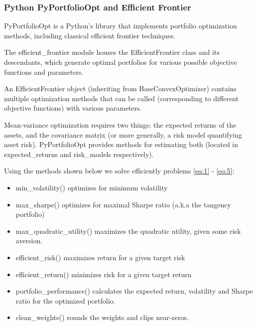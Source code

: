 \documentclass{beamer}
\begin{document}
\begin{frame}
\frametitle{\textbf{Python PyPortfolioOpt and Efficient Frontier}}

\justifying
PyPortfolioOpt is a Python's library that implements portfolio optimization methods, including classical efficient frontier techniques.

\vspace{0.2cm}
\justifying
The efficient\_frontier module houses the EfficientFrontier class and its descendants, which generate optimal portfolios for various possible objective functions and parameters.

\vspace{0.2cm}
\justifying
An EfficientFrontier object (inheriting from BaseConvexOptimizer) contains multiple optimization methods that can be called (corresponding to different objective functions) with various parameters.

\vspace{0.2cm}
\justifying
Mean-variance optimization requires two things: the expected returns of the assets, and the covariance matrix (or more generally, a risk model quantifying asset risk). PyPortfolioOpt provides methods for estimating both (located in expected\_returns and risk\_models respectively).

\end{frame}


\begin{frame}

\justifying
Using the methods shown below we solve efficiently problems \eqref{eq:1} - \eqref{eq:5}:

\vspace{0.4cm}
\justifying
\begin{itemize}
	\item min\_volatility() optimizes for minimum volatility
	\item max\_sharpe() optimizes for maximal Sharpe ratio (a.k.a the tangency portfolio)
	\item max\_quadratic\_utility() maximizes the quadratic utility, given some risk aversion.
	\item efficient\_risk() maximizes return for a given target risk
	\item efficient\_return() minimizes risk for a given target return
	\item portfolio\_performance() calculates the expected return, volatility and Sharpe ratio for the optimized portfolio.
	\item clean\_weights() rounds the weights and clips near-zeros.
\end{itemize}

\end{frame}
\end{document}
